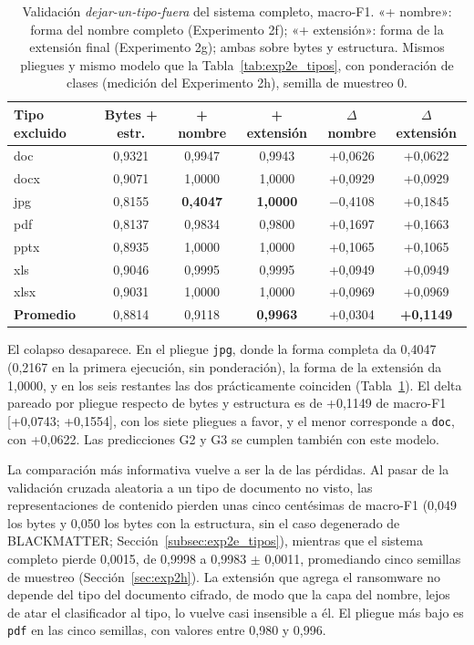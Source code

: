 \begin{table}[ht]
\centering
\caption{Validación \textit{dejar-un-tipo-fuera} del sistema completo, macro-F1. «+ nombre»: forma del nombre completo (Experimento 2f); «+ extensión»: forma de la extensión final (Experimento 2g); ambas sobre bytes y estructura. Mismos pliegues y mismo modelo que la Tabla~\ref{tab:exp2e_tipos}, con ponderación de clases (medición del Experimento 2h), semilla de muestreo 0.}
\label{tab:exp2g_tipos}
\small
\begin{tabular}{|l|c|c|c|c|c|}
\hline
\textbf{Tipo excluido} & \textbf{Bytes + estr.} & \textbf{+ nombre} & \textbf{+ extensión} & \textbf{$\Delta$ nombre} & \textbf{$\Delta$ extensión} \\
\hline
doc & 0,9321 & 0,9947 & 0,9943 & +0,0626 & +0,0622 \\
docx & 0,9071 & 1,0000 & 1,0000 & +0,0929 & +0,0929 \\
jpg & 0,8155 & \textbf{0,4047} & \textbf{1,0000} & $-$0,4108 & +0,1845 \\
pdf & 0,8137 & 0,9834 & 0,9800 & +0,1697 & +0,1663 \\
pptx & 0,8935 & 1,0000 & 1,0000 & +0,1065 & +0,1065 \\
xls & 0,9046 & 0,9995 & 0,9995 & +0,0949 & +0,0949 \\
xlsx & 0,9031 & 1,0000 & 1,0000 & +0,0969 & +0,0969 \\
\hline
\textbf{Promedio} & 0,8814 & 0,9118 & \textbf{0,9963} & +0,0304 & \textbf{+0,1149} \\
\hline
\end{tabular}
\end{table}

El colapso desaparece. En el pliegue \texttt{jpg}, donde la forma completa da 0,4047 (0,2167 en la primera ejecución, sin ponderación), la forma de la extensión da 1,0000, y en los seis restantes las dos prácticamente coinciden (Tabla~\ref{tab:exp2g_tipos}). El delta pareado por pliegue respecto de bytes y estructura es de +0,1149 de macro-F1 [+0,0743; +0,1554], con los siete pliegues a favor, y el menor corresponde a \texttt{doc}, con +0,0622. Las predicciones G2 y G3 se cumplen también con este modelo.

La comparación más informativa vuelve a ser la de las pérdidas. Al pasar de la validación cruzada aleatoria a un tipo de documento no visto, las representaciones de contenido pierden unas cinco centésimas de macro-F1 (0,049 los bytes y 0,050 los bytes con la estructura, sin el caso degenerado de BLACKMATTER; Sección~\ref{subsec:exp2e_tipos}), mientras que el sistema completo pierde 0,0015, de 0,9998 a 0,9983 $\pm$ 0,0011, promediando cinco semillas de muestreo (Sección~\ref{sec:exp2h}). La extensión que agrega el ransomware no depende del tipo del documento cifrado, de modo que la capa del nombre, lejos de atar el clasificador al tipo, lo vuelve casi insensible a él. El pliegue más bajo es \texttt{pdf} en las cinco semillas, con valores entre 0,980 y 0,996.

